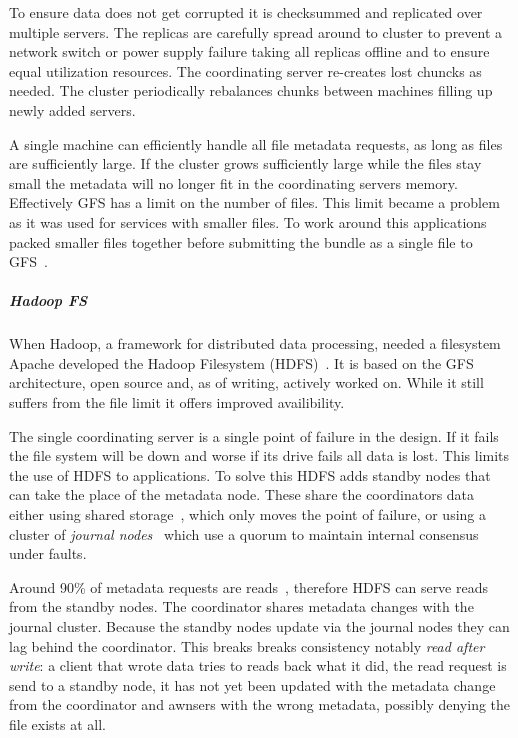 To ensure data does not get corrupted it is checksummed and replicated over multiple servers. The replicas are carefully spread around to cluster to prevent a network switch or power supply failure taking all replicas offline and to ensure equal utilization resources. The coordinating server re-creates lost chuncks as needed. The cluster periodically rebalances chunks between machines filling up newly added servers. 

A single machine can efficiently handle all file metadata requests, as long as files are sufficiently large. If the cluster grows sufficiently large while the files stay small the metadata will no longer fit in the coordinating servers memory. Effectively \textsc{GFS} has a limit on the number of files. This limit became a problem as it was used for services with smaller files. To work around this applications packed smaller files together before submitting the bundle as a single file to \textsc{GFS}~\cite{GFS_interview}.

\subparagraph*{Hadoop FS}
When Hadoop, a framework for distributed data processing, needed a filesystem Apache developed the Hadoop Filesystem (HDFS)~\cite{hdfs}. It is based on the \textsc{GFS} architecture, open source and, as of writing, actively worked on. While it still suffers from the file limit it offers improved availibility.

The single coordinating server is a single point of failure in the design. If it fails the file system will be down and worse if its drive fails all data is lost. This limits the use of HDFS to applications. To solve this HDFS adds standby nodes that can take the place of the metadata node. These share the coordinators data either using shared storage~\cite{hdfs_ha_nfs}, which only moves the point of failure, or using a cluster of \textit{journal nodes}~\cite{hdfs_ha_q} which use a quorum to maintain internal consensus under faults. 

Around 90\% of metadata requests are reads~\cite{hdfs_ha_reads}, therefore \textsc{HDFS} can serve reads from the standby nodes. The coordinator shares metadata changes with the journal cluster. Because the standby nodes update via the journal nodes they can lag behind the coordinator. This breaks breaks consistency notably \textit{read after write}: a client that wrote data tries to reads back what it did, the read request is send to a standby node, it has not yet been updated with the metadata change from the coordinator and awnsers with the wrong metadata, possibly denying the file exists at all. 

